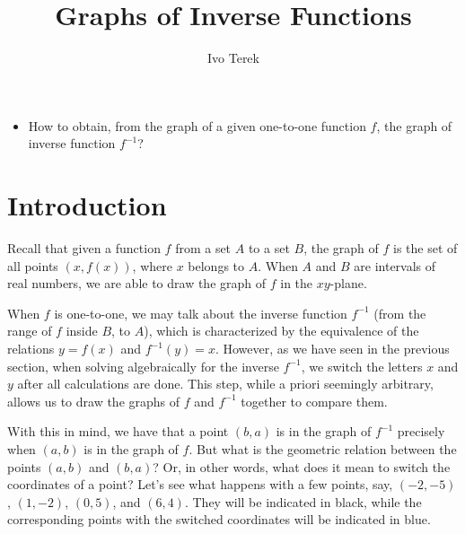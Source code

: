 \documentclass[nooutcomes]{ximera}
\author{Ivo Terek}
\title{Graphs of Inverse Functions}
\begin{document}
\begin{abstract}
  
\end{abstract}
\maketitle



\begin{motivatingQuestions}\begin{itemize}
\item How to obtain, from the graph of a given one-to-one function $f$, the graph of inverse function $f^{-1}$?
\end{itemize}\end{motivatingQuestions}



\section{Introduction}

Recall that given a function $f$ from a set $A$ to a set $B$, the graph of $f$ is the set of all points $(x,f(x))$, where $x$ belongs to $A$. When $A$ and $B$ are intervals of real numbers, we are able to draw the graph of $f$ in the $xy$-plane.

When $f$ is one-to-one, we may talk about the inverse function $f^{-1}$ (from the range of $f$ inside $B$, to $A$), which is characterized by the equivalence of the relations $y=f(x)$ and $f^{-1}(y) = x$. However, as we have seen in the previous section, when solving algebraically for the inverse $f^{-1}$, we switch the letters $x$ and $y$ after all calculations are done. This step, while a priori seemingly arbitrary, allows us to draw the graphs of $f$ and $f^{-1}$ together to compare them.

With this in mind, we have that a point $(b,a)$ is in the graph of $f^{-1}$ precisely when $(a,b)$ is in the graph of $f$. But what is the geometric relation between the points $(a,b)$ and $(b,a)$? Or, in other words, what does it mean to switch the coordinates of a point? Let's see what happens with a few points, say, $(-2,-5)$, $(1,-2)$, $(0,5)$, and $(6,4)$. They will be indicated in black, while the corresponding points with the switched coordinates will be indicated in blue.
\end{document}
